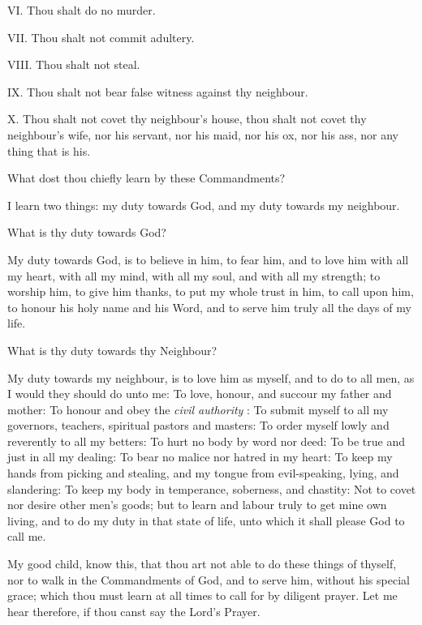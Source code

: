 VI. Thou shalt do no murder.

VII. Thou shalt not commit adultery.

VIII. Thou shalt not steal.

IX. Thou shalt not bear false witness against thy neighbour.

X. Thou shalt not covet thy neighbour's house, thou shalt not covet thy neighbour's wife, nor his servant, nor his maid, nor his ox, nor his ass, nor any thing that is his.

\medskip
\centerline{}
What dost thou chiefly learn by these Commandments?

 I learn two things: my duty towards God, and my duty towards my neighbour.

 What is thy duty towards God?

 My duty towards God, is to believe in him, to fear him, and to love him with all my heart, with all my mind, with all my soul, and with all my strength; to worship him, to give him thanks, to put my whole trust in him, to call upon him, to honour his holy name and his Word, and to serve him truly all the days of my life.

 What is thy duty towards thy Neighbour?

 My duty towards my neighbour, is to love him as myself, and to do to all men, as I would they should do unto me: To love, honour, and succour my father and mother: To honour and obey the \emph{civil authority}%
: To submit myself to all my governors, teachers, spiritual pastors and masters: To order myself lowly and reverently to all my betters: To hurt no body by word nor deed: To be true and just in all my dealing: To bear no malice nor hatred in my heart: To keep my hands from picking and stealing, and my tongue from evil-speaking, lying, and slandering: To keep my body in temperance, soberness, and chastity: Not to covet nor desire other men's goods; but to learn and labour truly to get mine own living, and to do my duty in that state of life, unto which it shall please God to call me.

\medskip
\centerline{}
My good child, know this, that thou art not able to do these things of thyself, nor to walk in the Commandments of God, and to serve him, without his special grace; which thou must learn at all times to call for by diligent prayer. Let me hear therefore, if thou canst say the Lord's Prayer.

